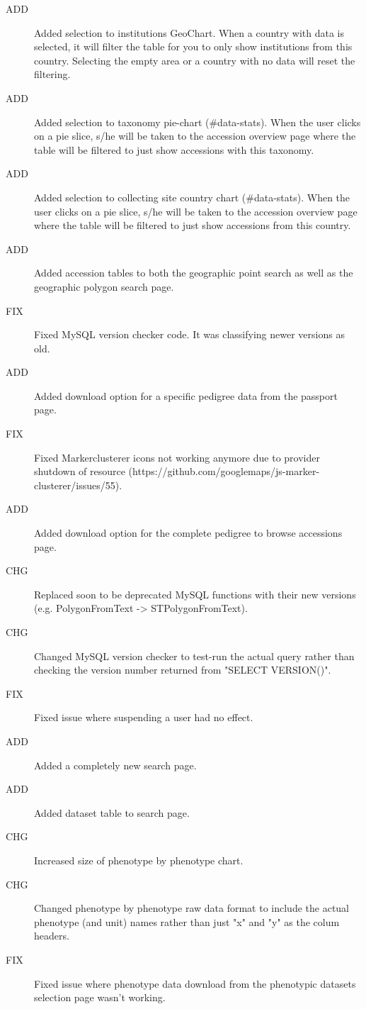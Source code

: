 \begin{description}
	\item[ADD]Added selection to institutions GeoChart. When a country with data is selected, it will filter the table for you to only show institutions from this country. Selecting the empty area or a country with no data will reset the filtering.
	\item[ADD]Added selection to taxonomy pie-chart (\#data-stats). When the user clicks on a pie slice, s/he will be taken to the accession overview page where the table will be filtered to just show accessions with this taxonomy.
	\item[ADD]Added selection to collecting site country chart (\#data-stats). When the user clicks on a pie slice, s/he will be taken to the accession overview page where the table will be filtered to just show accessions from this country.
	\item[ADD]Added accession tables to both the geographic point search as well as the geographic polygon search page.
	\item[FIX]Fixed MySQL version checker code. It was classifying newer versions as old.
	\item[ADD]Added download option for a specific pedigree data from the passport page.
	\item[FIX]Fixed Markerclusterer icons not working anymore due to provider shutdown of resource (https://github.com/googlemaps/js-marker-clusterer/issues/55).
	\item[ADD]Added download option for the complete pedigree to browse accessions page.
	\item[CHG]Replaced soon to be deprecated MySQL functions with their new versions (e.g. PolygonFromText -> ST\textunderscore PolygonFromText).
	\item[CHG]Changed MySQL version checker to test-run the actual query rather than checking the version number returned from "SELECT VERSION()".
	\item[FIX]Fixed issue where suspending a user had no effect.
	\item[ADD]Added a completely new search page.
	\item[ADD]Added dataset table to search page.
	\item[CHG]Increased size of phenotype by phenotype chart.
	\item[CHG]Changed phenotype by phenotype raw data format to include the actual phenotype (and unit) names rather than just "x" and "y" as the colum headers.
	\item[FIX]Fixed issue where phenotype data download from the phenotypic datasets selection page wasn't working.

\end{description}
